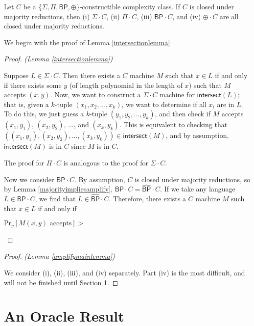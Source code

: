 \documentclass[11pt]{article}
\newcommand{\pr}{\text{Pr}}
\newcommand{\bp}{\textsf{BP}}
\newcommand{\strongbp}{\widehat{\textsf{BP}}}
\newcommand{\parity}{\oplus}
\newcommand{\intersect}{\textsf{intersect}}
\begin{document}
\begin{lemma}\label{amplifymainlemma}
Let $C$ be a \emph{$\{\Sigma,\Pi,\bp,\parity\}$}-constructible complexity class. If $C$ is closed under majority reductions, then (i) \emph{$\Sigma \cdot C$}, (ii) \emph{$\Pi \cdot C$}, (iii) \emph{$\bp \cdot C$}, and (iv) \emph{$\parity \cdot C$} are all closed under majority reductions.
\end{lemma}
We begin with the proof of Lemma \ref{intersectionlemma}
\begin{proof} \emph{(Lemma \ref{intersectionlemma})}

Suppose $L \in \Sigma\cdot C$. Then there exists a $C$ machine $M$ such that $x \in L$ if and only if there exists some $y$ (of length polynomial in the length of $x$) such that $M$ accepts $(x, y)$. Now, we want to construct a $\Sigma \cdot C$ machine for $\intersect(L)$; that is, given a $k$-tuple $(x_1,x_2,...,x_k)$, we want to determine if all $x_i$ are in $L$. To do this, we just guess a $k$-tuple $(y_1,y_2,...,y_k)$, and then check if $M$ accepts $(x_1, y_1)$, $(x_2, y_2)$, ..., and $(x_k, y_k)$. This is equivalent to checking that $((x_1,y_1),(x_2,y_2),...,(x_k,y_k)) \in \intersect(M)$, and by assumption, $\intersect(M)$ is in $C$ since $M$ is in $C$.

The proof for $\Pi \cdot C$ is analogous to the proof for $\Sigma \cdot C$.

Now we consider $\bp \cdot C$. By assumption, $C$ is closed under majority reductions, so by Lemma \ref{majorityimpliesamplify}, $\bp \cdot C = \strongbp \cdot C$. If we take any language $L \in \bp \cdot C$, we find that $L \in \strongbp \cdot C$. Therefore, there exists a $C$ machine $M$ such that $x\in L$ if and only if
\begin{center}
$\displaystyle \pr_y [M(x,y)\text{ accepts}] > $
\end{center}
\end{proof}

\begin{proof} \emph{(Lemma \ref{amplifymainlemma})}

We consider (i), (ii), (iii), and (iv) separately. Part (iv) is the most difficult, and will not be finished until Section \ref{oracle}.
\end{proof}

\section{An Oracle Result}\label{oracle}
\end{document}

